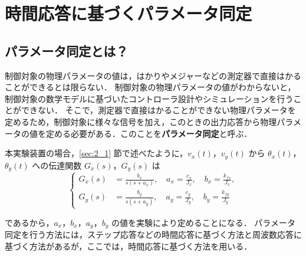 \section{時間応答に基づくパラメータ同定}
\subsection{パラメータ同定とは？}

制御対象の物理パラメータの値は，はかりやメジャーなどの測定器で直接はかることができるとは限らない．
制御対象の物理パラメータの値がわからないと，制御対象の数学モデルに基づいたコントローラ設計やシミュレーションを行うことができない．
そこで，測定器で直接はかることができない物理パラメータを定めるため，制御対象に様々な信号を加え，このときの出力応答から物理パラメータの値を定める必要がある．このことを\textbf{パラメータ同定}と呼ぶ．

本実験装置の場合，\ref{sec:2_1} 節で述べたように，$v_x(t)$，$v_y(t)$ から $\theta_x(t)$，$\theta_y(t)$ への伝達関数 $G_x(s)$，$G_y(s)$ は
\begin{equation}
\left\{
\begin{aligned}
G_x(s) &= \frac{b_x}{s(s + a_x)}, \quad a_x = \frac{c_x}{J_x}, \quad b_x = \frac{k_{fx}}{J_x}, \\
G_y(s) &= \frac{b_y}{s(s + a_y)}, \quad a_y = \frac{c_y}{J_y}, \quad b_y = \frac{k_{fy}}{J_y}
\end{aligned}
\right.
\label{eq:gx_gy_transfer}
\end{equation}

であるから，$a_x$，$b_x$，$a_y$，$b_y$ の値を実験により定めることになる．
パラメータ同定を行う方法には，ステップ応答などの時間応答に基づく方法と周波数応答に基づく方法があるが，ここでは，時間応答に基づく方法を用いる．
